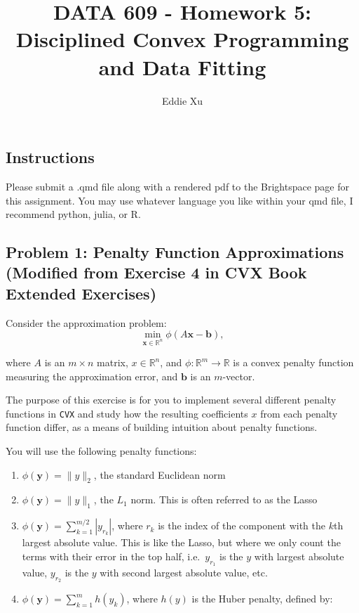 \documentclass[
  letterpaper,
  DIV=11,
  numbers=noendperiod]{scrartcl}
\title{DATA 609 - Homework 5: Disciplined Convex Programming and Data
Fitting}
\author{Eddie Xu}
\date{}
\providecommand{\tightlist}{%
  \setlength{\itemsep}{0pt}\setlength{\parskip}{0pt}}\usepackage{longtable,booktabs,array}
\begin{document}
\maketitle


\subsection{Instructions}\label{instructions}

Please submit a .qmd file along with a rendered pdf to the Brightspace
page for this assignment. You may use whatever language you like within
your qmd file, I recommend python, julia, or R.

\subsection{Problem 1: Penalty Function Approximations (Modified from
Exercise 4 in CVX Book Extended
Exercises)}\label{problem-1-penalty-function-approximations-modified-from-exercise-4-in-cvx-book-extended-exercises}

Consider the approximation problem: \[
\min_{\mathbf{x}\in\mathbb{R}^n} \phi\left(A\mathbf{x}-\mathbf{b}\right),
\]

where \(A\) is an \(m\times n\) matrix, \(x\in\mathbb{R}^n\), and
\(\phi: \mathbb{R}^m\to\mathbb{R}\) is a convex penalty function
measuring the approximation error, and \(\mathbf{b}\) is an
\(m\)-vector.

The purpose of this exercise is for you to implement several different
penalty functions in \texttt{CVX} and study how the resulting
coefficients \(x\) from each penalty function differ, as a means of
building intuition about penalty functions.

You will use the following penalty functions:

\begin{enumerate}
\def\labelenumi{(\alph{enumi})}
\tightlist
\item
  \(\phi(\mathbf{y}) = \|y\|_2\), the standard Euclidean norm
\item
  \(\phi(\mathbf{y}) = \|y\|_1\), the \(L_1\) norm. This is often
  referred to as the Lasso
\item
  \(\phi(\mathbf{y}) = \sum_{k=1}^{m/2} |y_{r_k}|\), where \(r_k\) is
  the index of the component with the \(k\)th largest absolute value.
  This is like the Lasso, but where we only count the terms with their
  error in the top half, i.e.~\(y_{r_1}\) is the \(y\) with largest
  absolute value, \(y_{r_2}\) is the \(y\) with second largest absolute
  value, etc.
\item
  \(\phi(\mathbf{y}) = \sum_{k=1}^m h(y_k)\), where \(h(y)\) is the
  Huber penalty, defined by:
\end{enumerate}
\end{document}
